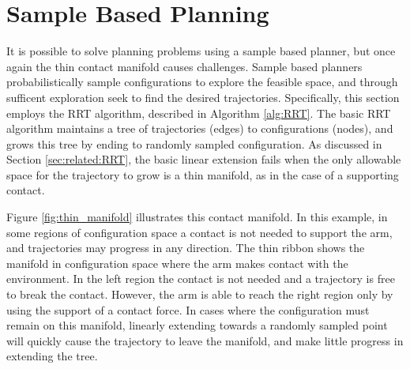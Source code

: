 \documentclass[../thesis.tex]{subfiles}
\begin{document}
\section{Sample Based Planning} \label{sec:sample_planning}
It is possible to solve planning problems using a sample based planner, but once again the thin contact manifold causes challenges.
Sample based planners probabilistically sample configurations to explore the feasible space, and through sufficent exploration seek to find the desired trajectories.
Specifically, this section employs the RRT algorithm, described in Algorithm \ref{alg:RRT}.
The basic RRT algorithm maintains a tree of trajectories (edges) to configurations (nodes), and grows this tree by ending to randomly sampled configuration.
As discussed in Section \ref{sec:related:RRT}, the basic linear extension fails when the only allowable space for the trajectory to grow is a thin manifold, as in the case of a supporting contact.

Figure \ref{fig:thin_manifold} illustrates this contact manifold.
In this example, in some regions of configuration space a contact is not needed to support the arm, and trajectories may progress in any direction.
The thin ribbon shows the manifold in configuration space where the arm makes contact with the environment. In the left region the contact is not needed and a trajectory is free to break the contact.
However, the arm is able to reach the right region only by using the support of a contact force.
In cases where the configuration must remain on this manifold, linearly extending towards a randomly sampled point will quickly cause the trajectory to leave the manifold, and make little progress in extending the tree.
\end{document}
